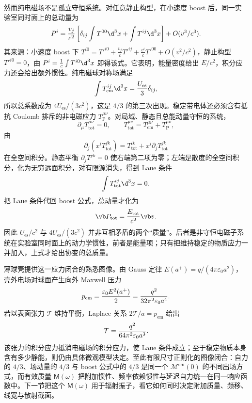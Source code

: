 然而纯电磁场不是孤立守恒系统。对任意静止构型，在小速度 boost 后，同一实验室同时面上的总动量为
\begin{equation*}
 P^i={v_j\over c^2}
 \left[
 \delta_{ij}\int T^{00}\d^3x
 +\int T^{ij}\d^3x
 \right]+O(v^3/c^3).
\end{equation*}
其来源：小速度 boost 下 $T^{i0}=T'^{i0}+\frac{v_j}{c}T'^{ij}+\frac{v^i}{c}T'^{00}+O(v^2/c^2)$，静止构型 $T'^{i0}=0$，由 $P^i=\frac1c\int T^{i0}\d^3x$ 即得该式。它表明，能量密度给出 $E/c^2$，积分应力还会给出额外惯性。纯电磁球对称场满足
\begin{equation*}
 \int T_{\mathrm{em}}^{ij}\d^3x
 ={U_{\mathrm{es}}\over3}\delta_{ij},
\end{equation*}
所以总系数成为 $4U_{\mathrm{es}}/(3c^2)$，这是 $4/3$ 的第三次出现。稳定带电体还必须含有抵抗 Coulomb 排斥的非电磁应力 $T_{\mathrm P}^{\mu\nu}$。对局域、静态且总能动量守恒的系统，
\begin{equation*}
 \partial_\mu T_{\mathrm{tot}}^{\mu\nu}=0,
 \qquad
 T_{\mathrm{tot}}^{\mu\nu}=T_{\mathrm{em}}^{\mu\nu}+T_{\mathrm P}^{\mu\nu},
\end{equation*}
由
\begin{equation*}
 \partial_j(x^iT_{\mathrm{tot}}^{jk})
 =T_{\mathrm{tot}}^{ik}+x^i\partial_jT_{\mathrm{tot}}^{jk}
\end{equation*}
在全空间积分。静态平衡 $\partial_jT^{jk}=0$ 使右端第二项为零；左端是散度的全空间积分，化为无穷远面积分，对有限源消失，得到 Laue 条件
\begin{equation*}
 \int T_{\mathrm{tot}}^{ij}\d^3x=0.
\end{equation*}
把 Laue 条件代回 boost 公式，总动量才化为
\begin{equation*}
 \vb P_{\mathrm{tot}}
 ={E_{\mathrm{tot}}\over c^2}\vb v.
\end{equation*}
因此 $U_{\mathrm{es}}/c^2$ 与 $4U_{\mathrm{es}}/(3c^2)$ 并非互相矛盾的两个“质量”。后者是非守恒电磁子系统在实验室同时面上的动力学惯性，前者是能量项；只有把维持稳定的物质应力一并加入，上式才给出协变的总质量。

薄球壳提供这一应力闭合的熟悉图像。由 Gauss 定律 $E(a^+)=q/(4\pi\varepsilon_0a^2)$，壳外电场对球面产生向外 Maxwell 压力
\begin{equation*}
 p_{\mathrm{em}}
 ={\varepsilon_0E^2(a^+)\over2}
 ={q^2\over32\pi^2\varepsilon_0a^4}.
\end{equation*}
若以表面张力 $\mathcal T$ 维持平衡，Laplace 关系 $2\mathcal T/a=p_{\mathrm{em}}$ 给出
\begin{equation*}
 \mathcal T={q^2\over64\pi^2\varepsilon_0a^3}.
\end{equation*}
该张力的积分应力抵消电磁场的积分应力，使 Laue 条件成立；至于稳定物质本身含有多少静能，则仍由具体微观模型决定。至此有限尺寸正则化的图像闭合：自力的 $4/3$、场动量的 $4/3$ 与 boost 公式中的 $4/3$ 是同一个 $\mathcal M^{\mathrm{em}}(0)$ 的不同出场方式，而有效质量 $\mathsf M(\omega)$ 把附加惯性、频率依赖惯性与延迟自力统一在同一响应函数中。下一节把这个 $\mathsf M(\omega)$ 用于辐射振子，看它如何同时决定附加质量、频移、线宽与散射截面。

